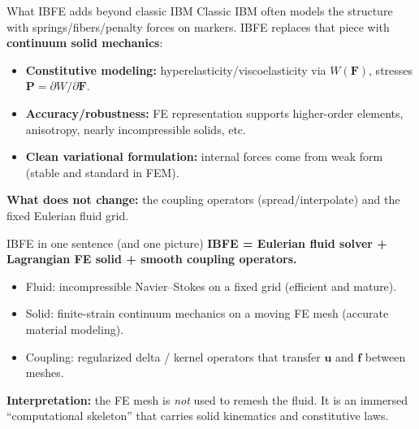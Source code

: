 \documentclass{beamer}
\begin{document}
\begin{frame}{What IBFE adds beyond classic IBM}
\small
Classic IBM often models the structure with springs/fibers/penalty forces on markers.
IBFE replaces that piece with \textbf{continuum solid mechanics}:

\medskip
\begin{itemize}
  \item \textbf{Constitutive modeling:} hyperelasticity/viscoelasticity via \(W(\bm{F})\), stresses \( \bm{P}=\partial W/\partial \bm{F}\).
  \item \textbf{Accuracy/robustness:} FE representation supports higher-order elements, anisotropy, nearly incompressible solids, etc.
  \item \textbf{Clean variational formulation:} internal forces come from weak form (stable and standard in FEM).
\end{itemize}

\medskip
\textbf{What does not change:} the coupling operators (spread/interpolate) and the fixed Eulerian fluid grid.
\end{frame}

\begin{frame}{IBFE in one sentence (and one picture)}
\small
\textbf{IBFE = Eulerian fluid solver + Lagrangian FE solid + smooth coupling operators.}

\medskip
\begin{itemize}
  \item Fluid: incompressible Navier--Stokes on a fixed grid (efficient and mature).
  \item Solid: finite-strain continuum mechanics on a moving FE mesh (accurate material modeling).
  \item Coupling: regularized delta / kernel operators that transfer \(\bm{u}\) and \(\bm{f}\) between meshes.
\end{itemize}

\medskip
\textbf{Interpretation:} the FE mesh is \emph{not} used to remesh the fluid.
It is an immersed ``computational skeleton'' that carries solid kinematics and constitutive laws.
\end{frame}
\end{document}
